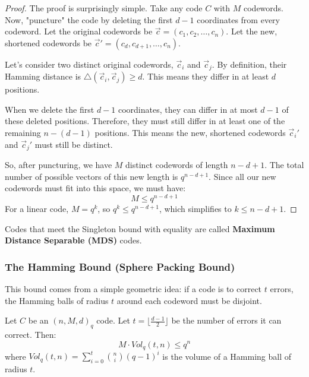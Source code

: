 \begin{proof}
The proof is surprisingly simple. Take any code $C$ with $M$ codewords. Now, "puncture" the code by deleting the first $d-1$ coordinates from every codeword.
Let the original codewords be $\vec{c} = (c_1, c_2, \dots, c_n)$.
Let the new, shortened codewords be $\vec{c}' = (c_d, c_{d+1}, \dots, c_n)$.

Let's consider two distinct original codewords, $\vec{c}_i$ and $\vec{c}_j$. By definition, their Hamming distance is $\triangle(\vec{c}_i, \vec{c}_j) \ge d$. This means they differ in at least $d$ positions.

When we delete the first $d-1$ coordinates, they can differ in at most $d-1$ of these deleted positions. Therefore, they must still differ in at least one of the remaining $n-(d-1)$ positions. This means the new, shortened codewords $\vec{c}_i'$ and $\vec{c}_j'$ must still be distinct.

So, after puncturing, we have $M$ distinct codewords of length $n-d+1$. The total number of possible vectors of this new length is $q^{n-d+1}$. Since all our new codewords must fit into this space, we must have:
\[ M \le q^{n-d+1} \]
For a linear code, $M=q^k$, so $q^k \le q^{n-d+1}$, which simplifies to $k \le n-d+1$.
\end{proof}
Codes that meet the Singleton bound with equality are called \textbf{Maximum Distance Separable (MDS)} codes.

\subsubsection{The Hamming Bound (Sphere Packing Bound)}

This bound comes from a simple geometric idea: if a code is to correct $t$ errors, the Hamming balls of radius $t$ around each codeword must be disjoint.

\begin{theorem}
Let $C$ be an $(n, M, d)_q$ code. Let $t = \lfloor \frac{d-1}{2} \rfloor$ be the number of errors it can correct. Then:
\[ M \cdot Vol_q(t, n) \le q^n \]
where $Vol_q(t, n) = \sum_{i=0}^t \binom{n}{i}(q-1)^i$ is the volume of a Hamming ball of radius $t$.
\end{theorem}

